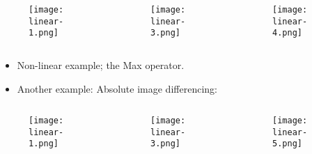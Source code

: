 
\begin{frame}
\begin{columns}
\begin{column}{.3\textwidth}
\begin{figure}
\centering
\texttt{[image: linear-1.png]}
\end{figure}
\end{column}
\begin{column}{.3\textwidth}
\begin{figure}
\centering
\texttt{[image: linear-3.png]}
\end{figure}
\end{column}
\begin{column}{.3\textwidth}
\begin{figure}
\centering
\texttt{[image: linear-4.png]}
\end{figure}
\end{column}
\end{columns}
\end{frame}


\begin{frame}
\begin{itemize}
\item Non-linear example; the Max operator.
\item Another example: Absolute image differencing:
\end{itemize}
\begin{columns}
\begin{column}{.3\textwidth}
\begin{figure}
\centering
\texttt{[image: linear-1.png]}
\end{figure}
\end{column}
\begin{column}{.3\textwidth}
\begin{figure}
\centering
\texttt{[image: linear-3.png]}
\end{figure}
\end{column}
\begin{column}{.3\textwidth}
\begin{figure}
\centering
\texttt{[image: linear-5.png]}
\end{figure}
\end{column}
\end{columns}
\end{frame}


